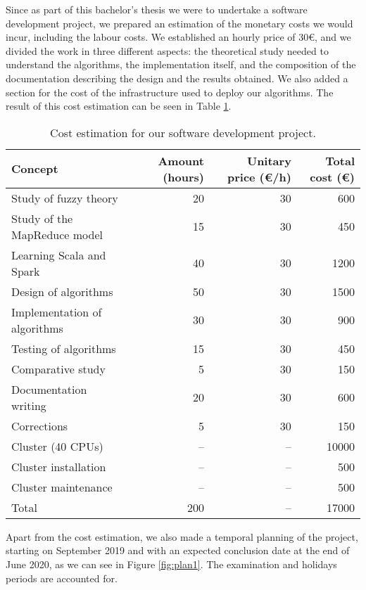 %
%
%

Since as part of this bachelor's thesis we were to undertake a software development project, we prepared an estimation of the monetary costs we would incur, including the labour costs. We established an hourly price of 30€, and we divided the work in three different aspects: the theoretical study needed to understand the algorithms, the implementation itself, and the composition of the documentation describing the design and the results obtained. We also added a section for the cost of the infrastructure used to deploy our algorithms. The result of this cost estimation can be seen in Table \ref{tab:cost}.

\begin{table}[h!]
  \centering
\caption{Cost estimation for our software development project.}
\label{tab:cost}
\begin{tabular}{lrrr}
\toprule
Concept & Amount (hours) & Unitary price (€/h) & Total cost (€) \\ \midrule
Study of fuzzy theory & 20 & 30 & 600\\
Study of the MapReduce model & 15 & 30 & 450\\
Learning Scala and Spark & 40 & 30 & 1200\\
\midrule
Design of algorithms & 50 & 30 & 1500\\
Implementation of algorithms & 30 & 30 & 900\\
Testing of algorithms & 15 & 30 & 450\\
Comparative study & 5 & 30 & 150\\
\midrule
Documentation writing & 20 & 30 & 600\\
Corrections & 5 & 30 & 150\\ \midrule
Cluster (40 CPUs) & -- & -- & 10000\\
Cluster installation & -- & -- & 500\\
Cluster maintenance & -- & -- &500 \\ \midrule
Total & 200 & -- & 17000\\ \bottomrule
\end{tabular}
\end{table}

Apart from the cost estimation, we also made a temporal planning of the project, starting on September 2019 and with an expected conclusion date at the end of June 2020, as we can see in Figure \ref{fig:plan1}. The examination and holidays periods are accounted for.

